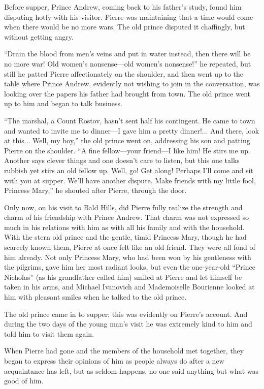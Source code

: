 Before supper, Prince Andrew, coming back to his father's study,
found him disputing hotly with his visitor. Pierre was
maintaining that a time would come when there would be no more
wars. The old prince disputed it chaffingly, but without getting
angry.

``Drain the blood from men's veins and put in water instead, then
there will be no more war! Old women's nonsense---old women's
nonsense!'' he repeated, but still he patted Pierre
affectionately on the shoulder, and then went up to the table
where Prince Andrew, evidently not wishing to join in the
conversation, was looking over the papers his father had brought
from town. The old prince went up to him and began to talk
business.

``The marshal, a Count Rostov, hasn't sent half his
contingent. He came to town and wanted to invite me to dinner---I
gave him a pretty dinner!... And there, look at this... Well, my
boy,'' the old prince went on, addressing his son and patting
Pierre on the shoulder. ``A fine fellow---your friend---I like
him! He stirs me up. Another says clever things and one doesn't
care to listen, but this one talks rubbish yet stirs an old
fellow up. Well, go! Get along! Perhaps I'll come and sit with
you at supper. We'll have another dispute. Make friends with my
little fool, Princess Mary,'' he shouted after Pierre, through
the door.

Only now, on his visit to Bald Hills, did Pierre fully realize
the strength and charm of his friendship with Prince Andrew. That
charm was not expressed so much in his relations with him as with
all his family and with the household. With the stern old prince
and the gentle, timid Princess Mary, though he had scarcely known
them, Pierre at once felt like an old friend. They were all fond
of him already. Not only Princess Mary, who had been won by his
gentleness with the pilgrims, gave him her most radiant looks,
but even the one-year-old ``Prince Nicholas'' (as his grandfather
called him) smiled at Pierre and let himself be taken in his
arms, and Michael Ivanovich and Mademoiselle Bourienne looked at
him with pleasant smiles when he talked to the old prince.

The old prince came in to supper; this was evidently on Pierre's
account. And during the two days of the young man's visit he was
extremely kind to him and told him to visit them again.

When Pierre had gone and the members of the household met
together, they began to express their opinions of him as people
always do after a new acquaintance has left, but as seldom
happens, no one said anything but what was good of him.

